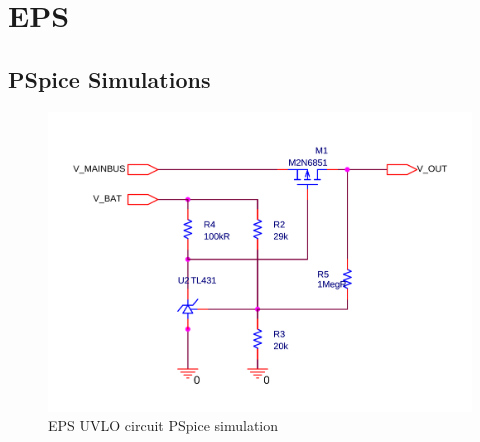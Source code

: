 \appendix

\chapter{EPS}\label{app:EPS}
%
\section{PSpice Simulations}
\label{app:EPS_PSpice}
%
%
\begin{figure}[H]
\centering
\includegraphics[scale=0.4]{figures/fig_CDR_PSpice_UVLO}
\caption{\ac{EPS} \ac{UVLO} circuit PSpice simulation}
\label{fig:PSpice_UVLO}
\end{figure}

